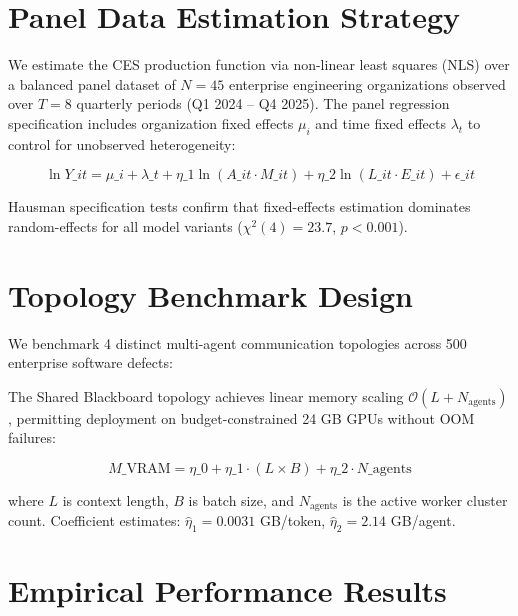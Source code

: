 \documentclass[10pt,twocolumn,letterpaper]{article}
\begin{document}
\section{Panel Data Estimation Strategy}


We estimate the CES production function via non-linear least squares (NLS) over a balanced panel dataset of $N = 45$ enterprise engineering organizations observed over $T = 8$ quarterly periods (Q1 2024 -- Q4 2025). The panel regression specification includes organization fixed effects $\mu_i$ and time fixed effects $\lambda_t$ to control for unobserved heterogeneity:

\begin{equation}
\ln Y\_{it} = \mu\_i + \lambda\_t + \eta\_1 \ln(A\_{it} \cdot M\_{it}) + \eta\_2 \ln(L\_{it} \cdot E\_{it}) + \epsilon\_{it}
\end{equation}

Hausman specification tests confirm that fixed-effects estimation dominates random-effects for all model variants ($\chi^2(4) = 23.7$, $p < 0.001$).




\section{Topology Benchmark Design}


We benchmark 4 distinct multi-agent communication topologies across 500 enterprise software defects:








The Shared Blackboard topology achieves linear memory scaling $\mathcal{O}(L + N_{\text{agents}})$, permitting deployment on budget-constrained 24 GB GPUs without OOM failures:

\begin{equation}
M\_{\text{VRAM}} = \eta\_0 + \eta\_1 \cdot (L \times B) + \eta\_2 \cdot N\_{\text{agents}}
\end{equation}

where $L$ is context length, $B$ is batch size, and $N_{\text{agents}}$ is the active worker cluster count. Coefficient estimates: $\hat{\eta}_1 = 0.0031$ GB/token, $\hat{\eta}_2 = 2.14$ GB/agent.


\section{Empirical Performance Results}
\end{document}
